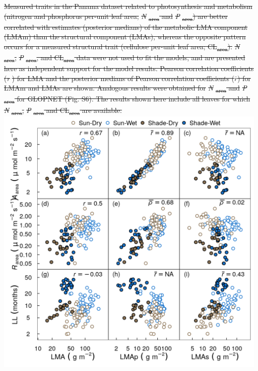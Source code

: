 \documentclass[
  12pt,
  letterpaper,
  DIV=11,
  numbers=noendperiod]{scrartcl}
\providecommand{\DIFadd}[1]{{\protect\color{blue}\uwave{#1}}} %
\providecommand{\DIFdel}[1]{{\protect\color{red}\sout{#1}}}                      %
\providecommand{\DIFaddFL}[1]{\DIFadd{#1}} %
\providecommand{\DIFdelFL}[1]{\DIFdel{#1}} %
\providecommand{\DIFaddbeginFL}{} %
\providecommand{\DIFaddendFL}{} %
\providecommand{\DIFdelbeginFL}{} %
\providecommand{\DIFdelendFL}{} %
\newcommand{\DIFscaledelfig}{0.5}
\newlength{\DIFdelgraphicswidth} %
\newlength{\DIFdelgraphicsheight} %
\newcommand{\DIFaddincludegraphics}[2][]{{\color{blue}\fbox{\DIFOincludegraphics[#1]{#2}}}} %
\newcommand{\DIFdelincludegraphics}[2][]{%
\sbox{\DIFdelgraphicsbox}{\DIFOincludegraphics[#1]{#2}}%
\settoboxwidth{\DIFdelgraphicswidth}{\DIFdelgraphicsbox} %
\settoboxtotalheight{\DIFdelgraphicsheight}{\DIFdelgraphicsbox} %
\scalebox{\DIFscaledelfig}{%
\parbox[b]{\DIFdelgraphicswidth}{\usebox{\DIFdelgraphicsbox}\\[-\baselineskip] \rule{\DIFdelgraphicswidth}{0em}}\llap{\resizebox{\DIFdelgraphicswidth}{\DIFdelgraphicsheight}{%
\setlength{\unitlength}{\DIFdelgraphicswidth}%
\begin{picture}(1,1)%
\thicklines\linethickness{2pt} %
{\color[rgb]{1,0,0}\put(0,0){\framebox(1,1){}}}%
{\color[rgb]{1,0,0}\put(0,0){\line( 1,1){1}}}%
{\color[rgb]{1,0,0}\put(0,1){\line(1,-1){1}}}%
\end{picture}%
}\hspace*{3pt}}} %
} %
\DeclareRobustCommand{\DIFaddbeginFL}{\DIFOaddbeginFL \let\includegraphics\DIFaddincludegraphics} %
\DeclareRobustCommand{\DIFaddendFL}{\DIFOaddendFL \let\includegraphics\DIFOincludegraphics} %
\DeclareRobustCommand{\DIFdelbeginFL}{\DIFOdelbeginFL \let\includegraphics\DIFdelincludegraphics} %
\DeclareRobustCommand{\DIFdelendFL}{\DIFOaddendFL \let\includegraphics\DIFOincludegraphics} %
\begin{document}
\DIFdelbeginFL %
{%
\DIFdelFL{Measured traits in the Panama dataset related
to photosynthesis and metabolism (nitrogen and phosphorus per-unit leaf
area; }\emph{\DIFdelFL{N}}%
\DIFdelFL{\textsubscript{area} and }\emph{\DIFdelFL{P}}%
\DIFdelFL{\textsubscript{area}) are
better correlated with estimates (posterior medians) of the metabolic
LMA component (LMAm) than the structural component (LMAs), whereas the
opposite pattern occurs for a measured structural trait (cellulose
per-unit leaf area; CL\textsubscript{area}).
}\emph{\DIFdelFL{N}}%
\DIFdelFL{\textsubscript{area}, }\emph{\DIFdelFL{P}}%
\DIFdelFL{\textsubscript{area}, and
CL\textsubscript{area} data were not used to fit the models, and are
presented here as independent support for the model results. Pearson
correlation coefficients (}\emph{\DIFdelFL{r}}%
\DIFdelFL{) for LMA and the posterior medians of
Pearson correlation coefficients (\(\bar{r}\)) for LMAm and LMAs are
shown. Analogous results were obtained for }\emph{\DIFdelFL{N}}%
\DIFdelFL{\textsubscript{area}
and }\emph{\DIFdelFL{P}}%
\DIFdelFL{\textsubscript{area} for GLOPNET (Fig. S6). The results
shown here include all leaves for which }\emph{\DIFdelFL{N}}%
\DIFdelFL{\textsubscript{area},
}\emph{\DIFdelFL{P}}%
\DIFdelFL{\textsubscript{area} and CL\textsubscript{area} are available.}}
\DIFdelendFL \DIFaddbeginFL \textbf{\DIFaddFL{Fig. 3:}} \includegraphics{../figs/pa_point.png} \newpage
\DIFaddendFL 
\end{document}
